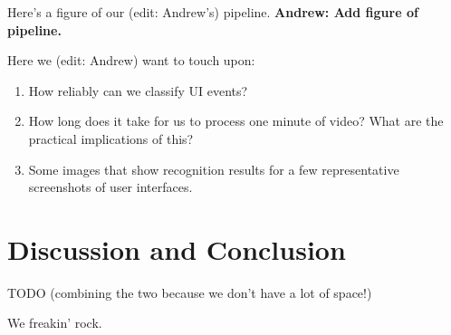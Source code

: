 \documentclass[10pt]{article}
\begin{document}
Here's a figure of our (edit: Andrew's) pipeline.  \textbf{Andrew: Add figure of pipeline.}

Here we (edit: Andrew) want to touch upon:
\begin{enumerate}[noitemsep]
\item How reliably can we classify UI events?
\item How long does it take for us to process one minute of video?  What are
the practical implications of this?
\item Some images that show recognition results for a few representative
screenshots of user interfaces.
\end{enumerate}


\section{Discussion and Conclusion}

TODO (combining the two because we don't have a lot of space!)

We freakin' rock.

\printbibliography
\end{document}
